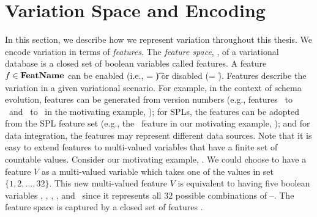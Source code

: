 \section{Variation Space and Encoding}
\label{sec:encode-var}




In this section, we describe how we represent variation throughout this 
thesis. 
We encode variation in terms of \emph{features}.
%
The \emph{feature space}, \fSet, of a variational database
is a closed set of boolean variables called features.
%
A feature \ensuremath{\fName \in \fSet} can be enabled (i.e., \fName = \t) or disabled (\fName = \f).
Features describe the variation in a given variational scenario.
%
%
For example, in the context of schema evolution, features can be generated from version 
numbers (e.g., features \vOne\ to \vFive\ and \tOne\ to \tFive\ in the 
motivating example, ); for SPLs, 
the features can be adopted from the SPL feature set (e.g., the \edu\ feature in
our motivating example, ); and 
for data integration, the features may represent different data sources.  
Note that it is easy to extend features
to multi-valued variables that have a finite set of countable values.
Consider our motivating example, . We could choose to have a feature $V$
as a multi-valued variable which takes one of the values in set $\{1, 2, \ldots, 32\}$. 
This new multi-valued feature $V$ is equivalent to having five boolean variables 
\vOne, \vTwo, \vThree, \vFour, and \vFive\ since it represents all $32$ possible
combinations of \vOne--\vFive.
%
The feature space is captured by a closed set of features \features.

